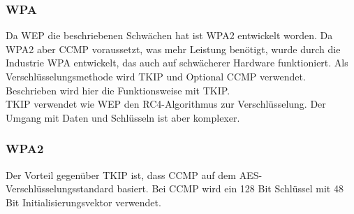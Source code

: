 \subsubsection{\ac{WPA}} 

Da \ac{WEP} die beschriebenen Schwächen hat ist \ac{WPA2} entwickelt worden. Da \ac{WPA2} aber \ac{CCMP} voraussetzt, was mehr Leistung benötigt, wurde durch die Industrie \ac{WPA} entwickelt, das auch auf schwächerer Hardware funktioniert. Als Verschlüsselungsmethode wird \ac{TKIP} und Optional \ac{CCMP} verwendet. Beschrieben wird hier die Funktionsweise mit \ac{TKIP}. \\
\ac{TKIP} verwendet wie \ac{WEP} den RC4-Algorithmus zur Verschlüsselung. Der Umgang mit Daten und Schlüsseln ist aber komplexer. 


\cite{SWB-378541420}
\subsubsection{\ac{WPA2}}

Der Vorteil gegenüber \ac{TKIP} ist, dass \ac{CCMP} auf dem \ac{AES}-Verschlüsselungsstandard basiert. Bei \ac{CCMP} wird ein 128 Bit Schlüssel mit 48 Bit Initialisierungsvektor verwendet. \cite{Tanenbaum}


